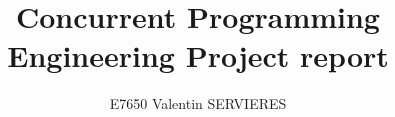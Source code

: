 \documentclass[a4paper,11pt,twoside]{article}
\begin{document}
\dosecttoc{} %
\clearpage

\setcounter{page}{1}
\title{Concurrent Programming Engineering Project report}
\author{E7650 Valentin SERVIERES}
\date{}
\maketitle





\end{document}
